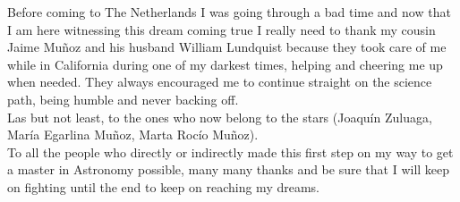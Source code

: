 Before coming to The Netherlands I was going through a bad time and now that I am here witnessing this dream coming true I really need to thank my cousin Jaime Mu\~noz and his husband William Lundquist because they took care of me while in California during one of my darkest times, helping and cheering me up when needed. They always encouraged me to continue straight on the science path, being humble and never backing off.\\ 

Las but not least, to the ones who now belong to the stars (Joaqu\'in Zuluaga, Mar\'ia Egarlina Mu\~noz, Marta Roc\'io Mu\~noz).\\

To all the people who directly or indirectly made this first step on my way to get a master in Astronomy possible, many many thanks and be sure that I will keep on fighting until the end to keep on reaching my dreams.

\endgroup



